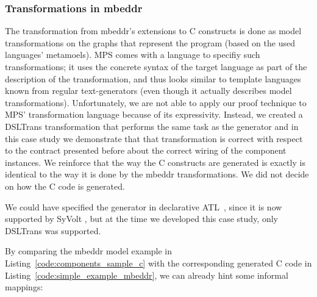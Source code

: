 \subsubsection{Transformations in mbeddr}

The transformation from mbeddr's extensions to C constructs is done as model
transformations on the graphs that represent the program (based on the used
languages' metamoels). MPS comes with a language to specifiy such
transformations; it uses the concrete syntax of the target language as part of
the description of the transformation, and thus looks similar to template
languages known from regular text-generators (even though it actually describes
model transformations). Unfortunately, we are not able to apply our proof
technique to MPS' transformation language because of its
expressivity. Instead, we created a DSLTrans transformation that performs the
same task as the generator and in this case study we demonstrate that that
transformation is correct with respect to the contract presented before about
the correct wiring of the component instances.
We reinforce that the way the C constructs are generated is exactly is
identical to the way it is done by the mbeddr transformations. 
We did not decide on how the C code is generated.

We could have specified the generator in declarative ATL~\cite{Jouault2006a},
since it is now supported by SyVolt \cite{Oakes2016}, but at the time we developed
this case study, only DSLTrans was supported.


By comparing the mbeddr model example in Listing~\ref{code:components_sample_c}
with the corresponding generated C code in
Listing~\ref{code:simple_example_mbeddr}, we can already hint some informal
mappings:

